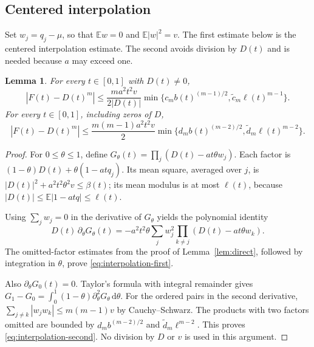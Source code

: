 \documentclass[11pt,reqno]{amsart}
\newtheorem{lem}[thm]{Lemma}
\theoremstyle{definition}
\theoremstyle{remark}
\numberwithin{equation}{section}
\newcommand{\E}{\mathbb E}
\newcommand{\dd}{\,\mathrm d}
\begin{document}
\subsection{Centered interpolation}

Set $w_j=q_j-\mu$, so that $\E w=0$ and $\E|w|^2=v$. The first estimate below is the centered interpolation estimate. The second avoids division by $D(t)$ and is needed because $a$ may exceed one.

\begin{lem}\label{lem:interpolation}
For every $t\in[0,1]$ with $D(t)\ne0$,
\begin{equation}\label{eq:interpolation-first}
 |F(t)-D(t)^m|
 \le\frac{ma^2t^2v}{2|D(t)|}
 \min\{c_m b(t)^{(m-1)/2},\widetilde c_m\ell(t)^{m-1}\}.
\end{equation}
For every $t\in[0,1]$, including zeros of $D$,
\begin{equation}\label{eq:interpolation-second}
 |F(t)-D(t)^m|
 \le\frac{m(m-1)a^2t^2v}{2}
 \min\{d_m b(t)^{(m-2)/2},\widetilde d_m\ell(t)^{m-2}\}.
\end{equation}
\end{lem}
\begin{proof}
For $0\le\theta\le1$, define
$G_\theta(t)=\prod_j(D(t)-at\theta w_j)$.
Each factor is $(1-\theta)D(t)+\theta(1-atq_j)$. Its mean square, averaged over $j$, is $|D(t)|^2+a^2t^2\theta^2v\le\beta(t)$; its mean modulus is at most $\ell(t)$, because $|D(t)|\le\E|1-atq|\le\ell(t)$.

Using $\sum_jw_j=0$ in the derivative of $G_\theta$ yields the polynomial identity
\[
 D(t)\,\partial_\theta G_\theta(t)
 =-a^2t^2\theta\sum_jw_j^2
       \prod_{k\ne j}(D(t)-at\theta w_k).
\]
The omitted-factor estimates from the proof of Lemma~\ref{lem:direct}, followed by integration in $\theta$, prove \eqref{eq:interpolation-first}.

Also $\partial_\theta G_0(t)=0$. Taylor's formula with integral remainder gives
$G_1-G_0=\int_0^1(1-\theta)\partial_\theta^2G_\theta\dd\theta$.
For the ordered pairs in the second derivative,
$\sum_{j\ne k}|w_jw_k|\le m(m-1)v$ by Cauchy--Schwarz.
The products with two factors omitted are bounded by $d_m b^{(m-2)/2}$ and $\widetilde d_m\ell^{m-2}$. This proves \eqref{eq:interpolation-second}. No division by $D$ or $v$ is used in this argument.
\end{proof}
\end{document}
